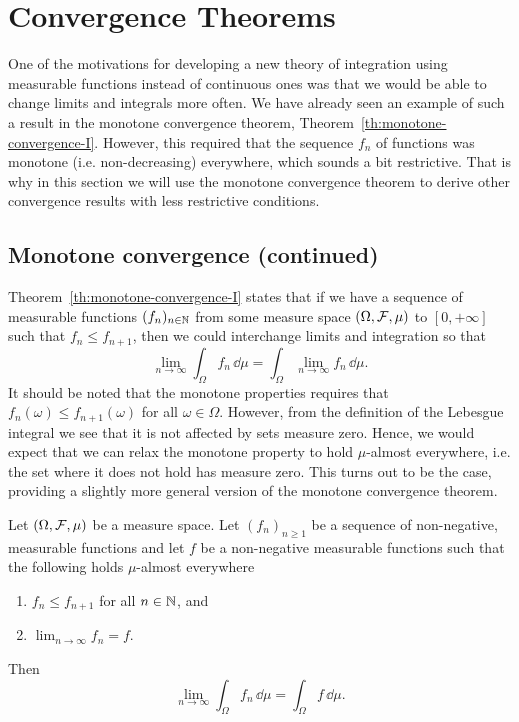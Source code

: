   

\section{Convergence Theorems}

One of the motivations for developing a new theory of integration using measurable functions instead of continuous ones was that we would be able to change limits and integrals more often. We have already seen an example of such a result in the monotone convergence theorem, Theorem~\ref{th:monotone-convergence-I}. However, this required that the sequence $f_n$ of functions was monotone (i.e. non-decreasing) everywhere, which sounds a bit restrictive. That is why in this section we will use the monotone convergence theorem to derive other convergence results with less restrictive conditions.

\subsection{Monotone convergence (continued)}

Theorem~\ref{th:monotone-convergence-I} states that if we have a sequence of measurable functions $(f_n)_{n \in \mathbb N}$ from some measure space $(\Omega, \mathcal F, \mu)$ to $[0,+\infty]$ such that $f_n \le f_{n+1}$, then we could interchange limits and integration so that
\[
	\lim_{n \to \infty} \int_\Omega f_n \, \dd \mu = \int_\Omega \lim_{n \to \infty} f_n \, \dd \mu.
\]
It should be noted that the monotone properties requires that $f_n(\omega) \le f_{n+1}(\omega)$ for all $\omega \in \Omega$. However, from the definition of the Lebesgue integral we see that it is not affected by sets measure zero. Hence, we would expect that we can relax the monotone property to hold $\mu$-almost everywhere, i.e. the set where it does not hold has measure zero. This turns out to be the case, providing a slightly more general version of the monotone convergence theorem.

\begin{theorem}\label{thm:monotone_convergence_ii}
Let $(\Omega, \mathcal F, \mu)$ be a measure space. Let $(f_n)_{n \ge 1}$ be a sequence of non-negative, measurable functions and let $f$ be a non-negative measurable functions such that the following holds $\mu$-almost everywhere
\begin{enumerate}[label={(\arabic*)}]
	\item $f_n \le f_{n+1}$ for all $n \in \mathbb N$, and
	\item $\lim_{n \to \infty} f_n = f$.
\end{enumerate}
Then
\[
	\lim_{n \to \infty} \int_\Omega f_n \,\dd \mu = \int_\Omega f \,\dd \mu.
\]
\end{theorem}

